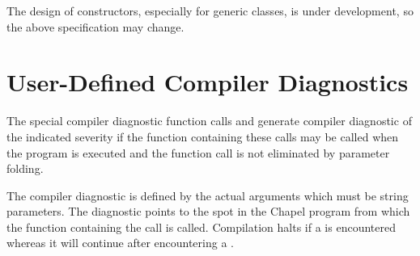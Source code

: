 \begin{openissue}
The design of constructors, especially for generic classes, is
under development, so the above specification may change.
\end{openissue}

\pagebreak
\section{User-Defined Compiler Diagnostics}
\label{User_Defined_Compiler_Errors}

The special compiler diagnostic function calls 
and  generate compiler diagnostic of the
indicated severity if the function containing these calls may be
called when the program is executed and the function call is not
eliminated by parameter folding.

The compiler diagnostic is defined by the actual arguments which must
be string parameters.  The diagnostic points to the spot in the Chapel
program from which the function containing the call is called.
Compilation halts if a  is encountered whereas it
will continue after encountering a .

